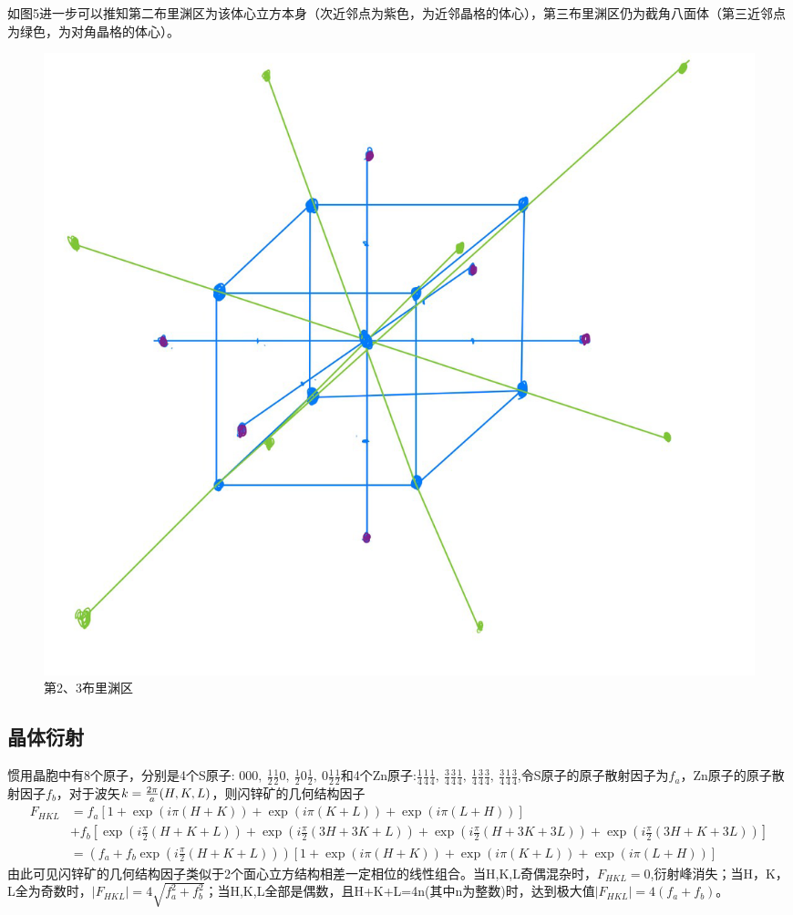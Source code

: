 \documentclass{article}
\begin{document}
	
	如图5进一步可以推知第二布里渊区为该体心立方本身（次近邻点为紫色，为近邻晶格的体心），第三布里渊区仍为截角八面体（第三近邻点为绿色，为对角晶格的体心）。
	\begin{figure}[!h]
		
		\centering
		\includegraphics[scale=0.2]{高}
		\caption{\heiti{}第2、3布里渊区}
		
	\end{figure}
\subsection{晶体衍射}
惯用晶胞中有8个原子，分别是4个S原子: $ 000,\ \frac{1}{2}\frac{1}{2}0,\ \frac{1}{2}0\frac{1}{2},\ 0\frac{1}{2}\frac{1}{2}  $和4个Zn原子:$ \frac{1}{4}\frac{1}{4}\frac{1}{4},\ \frac{3}{4}\frac{3}{4}\frac{1}{4},\ \frac{1}{4}\frac{3}{4}\frac{3}{4},\ \frac{3}{4}\frac{1}{4}\frac{3}{4}  $,令S原子的原子散射因子为$ f_a $，Zn原子的原子散射因子$ f_b $，对于波矢$ \boldmath{k}=\frac{2\pi}{a}(H,K,L) $，则闪锌矿的几何结构因子
\begin{equation}
	\begin{aligned}
		F_{HKL}&=f_a[1+\exp(i\pi(H+K))+\exp(i\pi(K+L))+\exp(i\pi(L+H))]\\
		&+f_b[\exp(i\frac{\pi}{2}(H+K+L))+\exp(i\frac{\pi}{2}(3H+3K+L))+\exp(i\frac{\pi}{2}(H+3K+3L))+\exp(i\frac{\pi}{2}(3H+K+3L))]\\
		&=(f_a+f_b\exp(i\frac{\pi}{2}(H+K+L)))[1+\exp(i\pi(H+K))+\exp(i\pi(K+L))+\exp(i\pi(L+H))]
	\end{aligned}
\label{eq:3}
\end{equation}
由此可见闪锌矿的几何结构因子类似于2个面心立方结构相差一定相位的线性组合。当H,K,L奇偶混杂时，$ F_{HKL}=0 $,衍射峰消失；当H，K，L全为奇数时，$ |F_{HKL}|=4\sqrt{f_a^2+f_b^2} $；当H,K,L全部是偶数，且H+K+L=4n(其中n为整数)时，达到极大值$ |F_{HKL}|=4(f_a+f_b) $。
\end{document}
